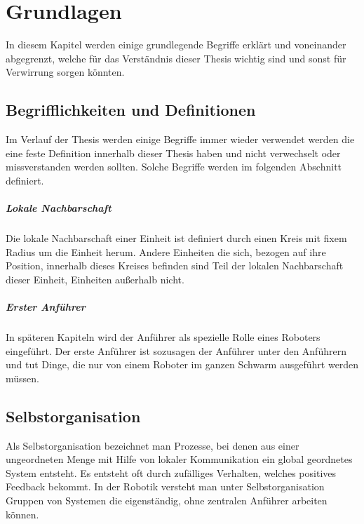 \chapter{Grundlagen}\label{ch:Grundlagen}

In diesem Kapitel werden einige grundlegende Begriffe erklärt und voneinander abgegrenzt, welche für das Verständnis dieser Thesis wichtig sind und sonst für Verwirrung sorgen könnten.

\section{Begrifflichkeiten und Definitionen}\label{Definitionen}

Im Verlauf der Thesis werden einige Begriffe immer wieder verwendet werden die eine feste Definition innerhalb dieser Thesis haben und nicht verwechselt oder missverstanden werden sollten. Solche Begriffe werden im folgenden Abschnitt definiert.

\paragraph*{Lokale Nachbarschaft}
Die lokale Nachbarschaft einer Einheit ist definiert durch einen Kreis mit fixem Radius um die Einheit herum. Andere Einheiten die sich, bezogen auf ihre Position, innerhalb dieses Kreises befinden sind Teil der lokalen Nachbarschaft dieser Einheit, Einheiten außerhalb nicht.

\paragraph*{Erster Anführer}
In späteren Kapiteln wird der Anführer als spezielle Rolle eines Roboters eingeführt. Der erste Anführer ist sozusagen der Anführer unter den Anführern und tut Dinge, die nur von einem Roboter im ganzen Schwarm ausgeführt werden müssen.

\section{Selbstorganisation}\label{sec:Selbstorganisation}

Als Selbstorganisation bezeichnet man Prozesse, bei denen aus einer ungeordneten Menge mit Hilfe von lokaler Kommunikation ein global geordnetes System entsteht.
Es entsteht oft durch zufälliges Verhalten, welches positives Feedback bekommt.
In der Robotik versteht man unter Selbstorganisation Gruppen von Systemen die eigenständig, ohne zentralen Anführer arbeiten können.

